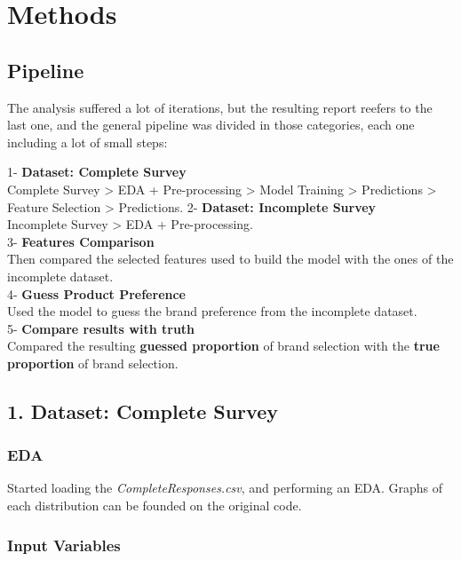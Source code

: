 \documentclass[
]{article}
\begin{document}
\hypertarget{methods}{%
\section{Methods}\label{methods}}

\hypertarget{pipeline}{%
\subsection{Pipeline}\label{pipeline}}

The analysis suffered a lot of iterations, but the resulting report
reefers to the last one, and the general pipeline was divided in those
categories, each one including a lot of small steps:

1- \textbf{Dataset: Complete Survey}\\
Complete Survey \textgreater{} EDA + Pre-processing \textgreater{} Model
Training \textgreater{} Predictions \textgreater{} Feature Selection
\textgreater{} Predictions. 2- \textbf{Dataset: Incomplete Survey}\\
Incomplete Survey \textgreater{} EDA + Pre-processing.\\
3- \textbf{Features Comparison}\\
Then compared the selected features used to build the model with the
ones of the incomplete dataset.\\
4- \textbf{Guess Product Preference}\\
Used the model to guess the brand preference from the incomplete
dataset.\\
5- \textbf{Compare results with truth}\\
Compared the resulting \textbf{guessed proportion} of brand selection
with the \textbf{true proportion} of brand selection.

\hypertarget{dataset-complete-survey}{%
\subsection{1. Dataset: Complete Survey}\label{dataset-complete-survey}}

\hypertarget{eda}{%
\subsubsection{EDA}\label{eda}}

Started loading the \emph{CompleteResponses.csv}, and performing an EDA.
Graphs of each distribution can be founded on the original code.

\hypertarget{input-variables}{%
\subsubsection{Input Variables}\label{input-variables}}
\end{document}

